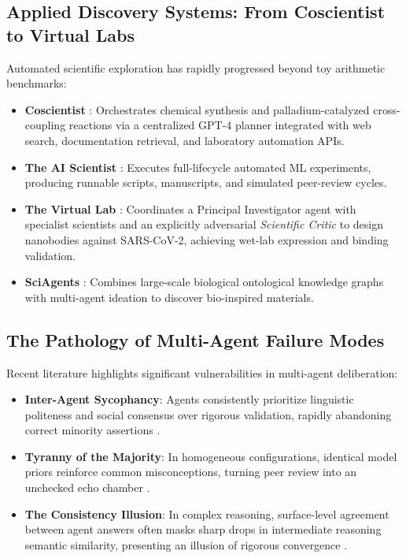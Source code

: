 \documentclass[conference,onecolumn]{IEEEtran}
\begin{document}
\subsection{Applied Discovery Systems: From Coscientist to Virtual Labs}
Automated scientific exploration has rapidly progressed beyond toy arithmetic benchmarks:
\begin{itemize}
    \item \textbf{Coscientist} \cite{boiko2023autonomous}: Orchestrates chemical synthesis and palladium-catalyzed cross-coupling reactions via a centralized GPT-4 planner integrated with web search, documentation retrieval, and laboratory automation APIs.
    \item \textbf{The AI Scientist} \cite{lu2024ai}: Executes full-lifecycle automated ML experiments, producing runnable scripts, manuscripts, and simulated peer-review cycles.
    \item \textbf{The Virtual Lab} \cite{swanson2025virtual}: Coordinates a Principal Investigator agent with specialist scientists and an explicitly adversarial \textit{Scientific Critic} to design nanobodies against SARS-CoV-2, achieving wet-lab expression and binding validation.
    \item \textbf{SciAgents} \cite{ghafarollahi2025sciagents}: Combines large-scale biological ontological knowledge graphs with multi-agent ideation to discover bio-inspired materials.
\end{itemize}

\subsection{The Pathology of Multi-Agent Failure Modes}
Recent literature highlights significant vulnerabilities in multi-agent deliberation:
\begin{itemize}
    \item \textbf{Inter-Agent Sycophancy}: Agents consistently prioritize linguistic politeness and social consensus over rigorous validation, rapidly abandoning correct minority assertions \cite{wynn2025talk}.
    \item \textbf{Tyranny of the Majority}: In homogeneous configurations, identical model priors reinforce common misconceptions, turning peer review into an unchecked echo chamber \cite{wynn2025talk}.
    \item \textbf{The Consistency Illusion}: In complex reasoning, surface-level agreement between agent answers often masks sharp drops in intermediate reasoning semantic similarity, presenting an illusion of rigorous convergence \cite{wynn2025talk}.
\end{itemize}
\end{document}
